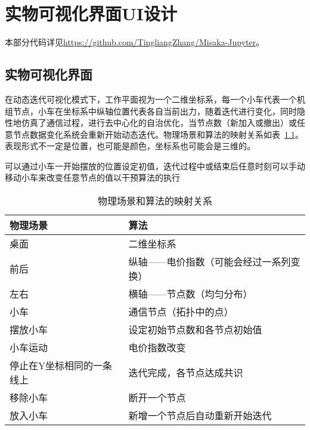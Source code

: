\chapter{实物可视化界面UI设计}
\label{cha:UI}

本部分代码详见\url{https://github.com/TingliangZhang/Misaka-Jupyter}。

\section{实物可视化界面}

在动态迭代可视化模式下，工作平面视为一个二维坐标系，每一个小车代表一个机组节点，小车在坐标系中纵轴位置代表各自当前出力，随着迭代进行变化，同时隐性地仿真了通信过程，进行去中心化的自治优化，当节点数（新加入或撤出）或任意节点数据变化系统会重新开始动态迭代。物理场景和算法的映射关系如表~\ref{tab:Real-Unreal}。表现形式不一定是位置，也可能是颜色，坐标系也可能会是三维的。

可以通过小车一开始摆放的位置设定初值，迭代过程中或结束后任意时刻可以手动移动小车来改变任意节点的值以干预算法的执行

\begin{table}[htbp]
    \centering
    \begin{tabular}{@{}ll@{}}
    \toprule
    物理场景          & 算法                   \\ \midrule
    桌面            & 二维坐标系                \\
    前后            & 纵轴——电价指数（可能会经过一系列变换） \\
    左右            & 横轴——节点数（均匀分布）        \\
    小车            & 通信节点（拓扑中的点）          \\
    摆放小车          & 设定初始节点数和各节点初始值       \\
    小车运动          & 电价指数改变               \\
    停止在Y坐标相同的一条线上 & 迭代完成，各节点达成共识         \\
    移除小车          & 断开一个节点               \\
    放入小车          & 新增一个节点后自动重新开始迭代      \\ \bottomrule
    \end{tabular}
    \caption{物理场景和算法的映射关系}
    \label{tab:Real-Unreal}
\end{table}

